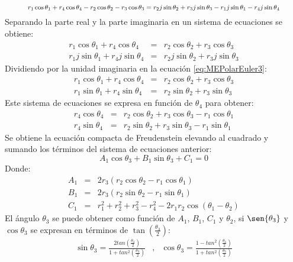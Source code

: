 \begin{equation}\label{eq:MEPolarEuler21}
\resizebox{0.9\textwidth}{!}{
$r_1 \cos{\theta_1}+r_4\cos{\theta_4}- r_2\cos{\theta_2}-r_3\cos{\theta_3}=r_2 j\sin{\theta_2}+r_3j\sin{\theta_3} -r_1 j \sin{\theta_1}-r_4j\sin{\theta_4}$
}
\end{equation} 
Separando la parte real y la parte imaginaria en un sistema de ecuaciones se obtiene:
\begin{eqnarray}
r_1 \cos{\theta_1}+r_4\cos{\theta_4}&=&r_2\cos{\theta_2} +r_3\cos{\theta_3} \label{eq:MEPolarEuler4} \\
r_1j\sin{\theta_1}+r_4j\sin{\theta_4} &=&r_2j\sin{\theta_2}+r_3j\sin{\theta_3}\label{eq:MEPolarEuler3}
\end{eqnarray}
Dividiendo por la unidad imaginaria en la ecuación \ref{eq:MEPolarEuler3}: 
\begin{eqnarray}
r_1 \cos{\theta_1}+r_4\cos{\theta_4}&=&r_2\cos{\theta_2} +r_3\cos{\theta_3} \label{eq:MEPolarEuler5} \\
r_1\sin{\theta_1}+r_4\sin{\theta_4} &=&r_2\sin{\theta_2}+r_3\sin{\theta_3}\label{eq:MEPolarEuler6}
\end{eqnarray}
Este sistema de ecuaciones se expresa en función de $\theta_4$ para obtener:
\begin{eqnarray}
r_4\cos{\theta_4}&=&r_2\cos{\theta_2} +r_3\cos{\theta_3}-r_1 \cos{\theta_1}\label{eq:MEPolarEuler7} \\
r_4\sin{\theta_4} &=&r_2\sin{\theta_2}+r_3\sin{\theta_3}-r_1\sin{\theta_1}\label{eq:MEPolarEuler8}
\end{eqnarray}
Se obtiene la ecuación compacta de Freudenstein elevando al cuadrado y sumando los términos
del sistema de ecuaciones anterior:
\begin{equation} \label{eq:A1B1C1}
 A_1\cos{\theta_3}+B_1\sin{\theta_3}+C_1=0 
\end{equation}
Donde:
\begin{eqnarray}
A_1&=& 2r_3(r_2\cos{\theta_2}-r_1\cos{\theta_1}) \label{eq:A1} \\
B_1&=& 2r_3(r_2\sin{\theta_2}-r_1\sin{\theta_1}) \label{eq:B1} \\
C_1&=& r_1^2+r_2^2+r_3^2-r_4^2 -2r_1r_2\cos(\theta_1-\theta_2) \label{eq:C1}
\end{eqnarray}
El ángulo $\theta_3$ se puede obtener como función de $A_1$, $B_1$, $C_1$ y $\theta_2$, si $\sen{\theta_3}$ y $\cos{\theta_3}$  se expresan en términos de $\tan(\frac{\theta_3}{2})$:
\begin{eqnarray}
\sin{\theta_3}= \frac{2tan(\frac{\theta_3}{2})}{1+tan^2(\frac{\theta_3}{2})}&,& \cos{\theta_3}= \frac{1-tan^2(\frac{\theta_3}{2})}{1+tan^2(\frac{\theta_3}{2})} \label{eq:enFuncionTheta3}
\end{eqnarray}

